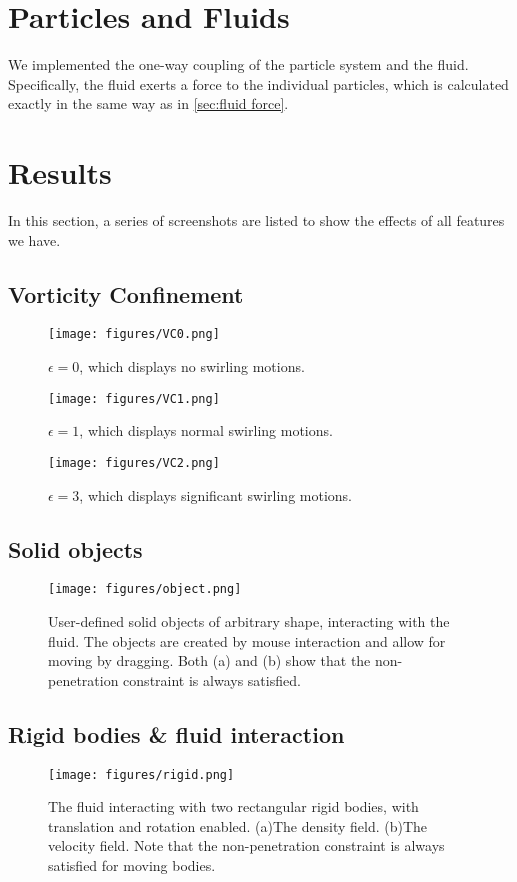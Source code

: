\section{Particles and Fluids}
We implemented the one-way coupling of the particle system and the fluid. Specifically, the fluid exerts a force to the individual particles, which is calculated exactly in the same way as in \autoref{sec:fluid force}. 

\section{Results}
In this section, a series of screenshots are listed to show the effects of all features we have.

\subsection{Vorticity Confinement}
\begin{figure}[h]
\centering
  \texttt{[image: figures/VC0.png]}
  \caption{$\epsilon = 0$, which displays no swirling motions.}
  \label{fig:object}
\end{figure}

\begin{figure}[H]
\centering
  \texttt{[image: figures/VC1.png]}
  \caption{$\epsilon = 1$, which displays normal swirling motions.}
  \label{fig:object}
\end{figure}

\begin{figure}[H]
\centering
  \texttt{[image: figures/VC2.png]}
  \caption{$\epsilon = 3$, which displays significant swirling motions.}
  \label{fig:object}
\end{figure}


\subsection{Solid objects}
\begin{figure}[H]
\centering
  \texttt{[image: figures/object.png]}
  \caption{User-defined solid objects of arbitrary shape, interacting with the fluid. The objects are created by mouse interaction and allow for moving by dragging. Both (a) and (b) show that the non-penetration constraint is always satisfied.}
  \label{fig:object}
\end{figure}

\subsection{Rigid bodies \& fluid interaction}
\begin{figure}[h]
\centering
  \texttt{[image: figures/rigid.png]}
  \caption{The fluid interacting with two rectangular rigid bodies, with translation and rotation enabled. (a)The density field. (b)The velocity field. Note that the non-penetration constraint is always satisfied for moving bodies.}
  \label{fig:rigid}
\end{figure}

